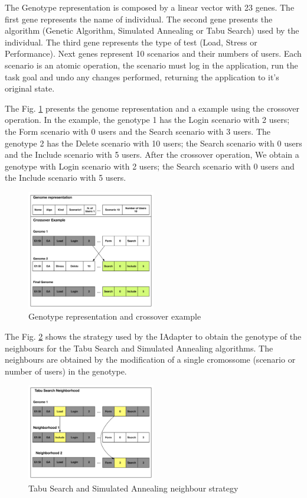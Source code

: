 The Genotype representation is composed by a linear vector with 23 genes. The first gene represents the name of individual. The second gene presents the  algorithm (Genetic Algorithm, Simulated Annealing or Tabu Search) used by the individual. The third gene represents the type of test (Load, Stress or Performance). Next genes represent 10 scenarios and their numbers of users. Each scenario is an atomic operation, the scenario must log in the application, run the task goal and undo any changes performed, returning the application to it's original state. 

The Fig. \ref{fig:genomarepresentation} presents the genome representation and  a example using the crossover operation. In the example, the genotype 1 has the Login scenario with 2 users; the Form scenario with 0 users and the Search scenario with 3 users. The genotype 2 has the Delete scenario with 10 users; the Search scenario with 0 users and the Include scenario with 5 users. After the crossover operation, We obtain a genotype with  Login scenario with 2 users; the Search scenario with 0 users and the Include scenario with 5 users.

\begin{figure}[h]
\includegraphics[width=0.5\textwidth]{./images/genomerepresentation.png}
\caption{Genotype representation and crossover example}
\label{fig:genomarepresentation}
\end{figure}

The Fig. \ref{fig:neighbourtaby} shows the strategy used by the IAdapter to obtain the genotype of the neighbours for the Tabu Search and Simulated Annealing algorithms.  The neighbours are obtained by the modification of a single cromossome (scenario or  number of users) in the genotype.

\begin{figure}[h]
\includegraphics[width=0.5\textwidth]{./images/TabuNE.png}
\caption{Tabu Search and Simulated Annealing neighbour strategy}
\label{fig:neighbourtaby}
\end{figure}


